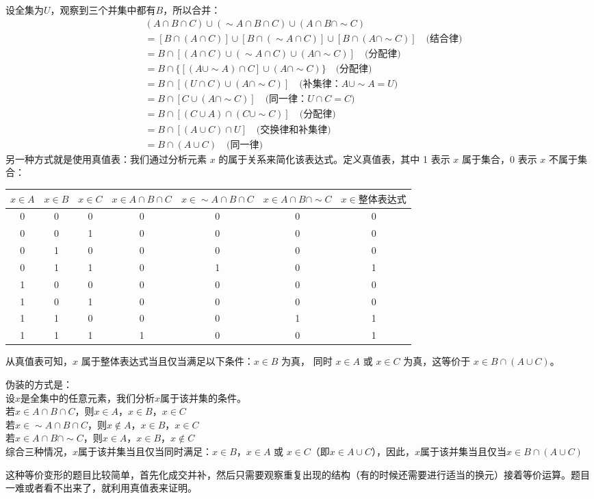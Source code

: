 \begin{solution}设全集为$U$，观察到三个并集中都有$B$，所以合并：
    \begin{align*}
& (A \cap B \cap C) \cup (\sim A \cap B \cap C) \cup (A \cap B \cap \sim C) \\
&= [B \cap (A \cap C)] \cup [B \cap (\sim A \cap C)] \cup [B \cap (A \cap \sim C)] \quad \text{(结合律)} \\
&= B \cap [(A \cap C) \cup (\sim A \cap C) \cup (A \cap \sim C)] \quad \text{(分配律)} \\
&= B \cap \{[(A \cup \sim A) \cap C] \cup (A \cap \sim C)\} \quad \text{(分配律)} \\
&= B \cap [(U \cap C) \cup (A \cap \sim C)] \quad \text{(补集律：$A \cup \sim A = U$)} \\
&= B \cap [C \cup (A \cap \sim C)] \quad \text{(同一律：$U \cap C = C$)} \\
&= B \cap [(C \cup A) \cap (C \cup \sim C)] \quad \text{(分配律)} \\
&= B \cap [(A \cup C) \cap U] \quad \text{(交换律和补集律)} \\
&= B \cap (A \cup C) \quad \text{(同一律)}
\end{align*}
另一种方式就是使用真值表：我们通过分析元素 $x$ 的属于关系来简化该表达式。定义真值表，其中 1 表示 $x$ 属于集合，0 表示 $x$ 不属于集合：
\begin{center}
\begin{tabular}{ccc|cccc}
$x \in A$ & $x \in B$ & $x \in C$ & $x \in A \cap B \cap C$ & $x \in \sim A \cap B \cap C$ & $x \in A \cap B \cap \sim C$ & $x \in \text{整体表达式}$ \\
\hline
0 & 0 & 0 & 0 & 0 & 0 & 0 \\
0 & 0 & 1 & 0 & 0 & 0 & 0 \\
0 & 1 & 0 & 0 & 0 & 0 & 0 \\
0 & 1 & 1 & 0 & 1 & 0 & 1 \\
1 & 0 & 0 & 0 & 0 & 0 & 0 \\
1 & 0 & 1 & 0 & 0 & 0 & 0 \\
1 & 1 & 0 & 0 & 0 & 1 & 1 \\
1 & 1 & 1 & 1 & 0 & 0 & 1 \\
\end{tabular}
\end{center}
从真值表可知，$x$ 属于整体表达式当且仅当满足以下条件：$x \in B$ 为真， 同时 $x \in A$ 或 $x \in C$ 为真，这等价于 $x \in B \cap (A \cup C)$。

伪装的方式是：\\
设$x$是全集中的任意元素，我们分析$x$属于该并集的条件。\\
若$x \in A \cap B \cap C$，则$x \in A$，$x \in B$，$x \in C$\\
若$x \in \sim A \cap B \cap C$，则$x \notin A$，$x \in B$，$x \in C$\\
若$x \in A \cap B \cap \sim C$，则$x \in A$，$x \in B$，$x \notin C$\\
综合三种情况，$x$属于该并集当且仅当同时满足：$x \in B$，$x \in A$ 或 $x \in C$（即$x \in A \cup C$），因此，$x$属于该并集当且仅当$x \in B \cap (A \cup C)$
\end{solution}
这种等价变形的题目比较简单，首先化成交并补，然后只需要观察重复出现的结构（有的时候还需要进行适当的换元）接着等价运算。题目一难或者看不出来了，就利用真值表来证明。
